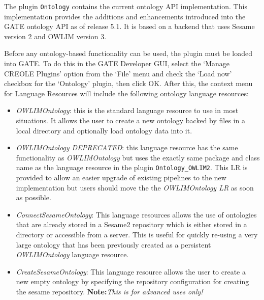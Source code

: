 

The plugin \texttt{Ontology} contains the current ontology API implementation. This
implementation provides the additions and enhancements introduced into the GATE
ontology API as of release 5.1. It is based on a backend that uses Sesame version 2
and OWLIM version 3. 

Before any ontology-based functionality can be used, the plugin must be loaded into
GATE. To do this in the GATE Developer GUI, select the `Manage CREOLE Plugins' 
option from the `File' menu and check the `Load now' checkbox for the `Ontology'
plugin, then click OK. After this, the context menu for Language Resources will
include the following ontology language resources:
\begin{itemize}
 \item \emph{OWLIMOntology}: this is the standard language resource to use in most situations.
 It allows the user to create a new ontology backed by files in a local directory
 and optionally load ontology data into it.
 \item \emph{OWLIMOntology DEPRECATED}: this language resource has the same functionality 
 as \emph{OWLIMOntology} but uses the exactly same package and class name as the 
 language resource in the plugin \verb!Ontology_OWLIM2!. This LR is provided to 
 allow an easier upgrade of existing pipelines to the new implementation but
 users should move the the \emph{OWLIMOntology LR} as soon as possible.
 \item \emph{ConnectSesameOntology}: This language resources allows the use of ontologies
 that are already stored in a Sesame2 repository which is either stored in a 
 directory or accessible from a server. This is useful for quickly re-using a
 very large ontology that has been previously created as a persistent \emph{OWLIMOntology}
 language resource.
 \item \emph{CreateSesameOntology}: This language resource allows the user to create a 
 new empty ontology by specifying the repository configuration for creating 
 the sesame repository. \textbf{Note:}\emph{This is for advanced uses only!}
\end{itemize}

